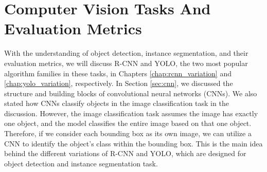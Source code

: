 \chapter{Computer Vision Tasks And Evaluation Metrics} \label{chap:segmentation_metric}





With the understanding of object detection, instance segmentation, and their evaluation metrics, we will discuss R-CNN and YOLO, the two most popular algorithm families in these tasks, in Chapters \ref{chap:rcnn_variation} and \ref{chap:yolo_variation}, respectively. In Section \ref{sec:cnn}, we discussed the structure and building blocks of convolutional neural networks (CNNs). We also stated how CNNs classify objects in the image classification task in the discussion. However, the image classification task assumes the image has exactly one object, and the model classifies the entire image based on that one object. Therefore, if we consider each bounding box as its own image, we can utilize a CNN to identify the object's class within the bounding box. This is the main idea behind the different variations of R-CNN and YOLO, which are designed for object detection and instance segmentation task. 